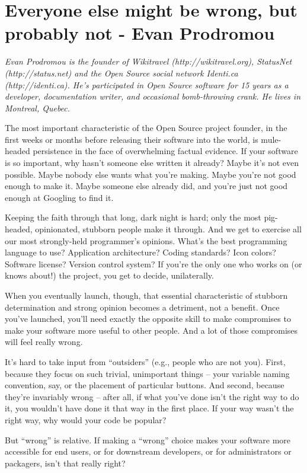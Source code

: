 \chapter{Everyone else might be wrong, but probably not - Evan Prodromou}

\textit{Evan Prodromou is the founder of Wikitravel (http://wikitravel.org), StatusNet (http://status.net) and the Open Source social network Identi.ca (http://identi.ca). He's participated in Open Source software for 15 years as a developer, documentation writer, and occasional bomb-throwing crank. He lives in Montreal, Quebec.}

The most important characteristic of the Open Source project founder, in the first weeks or months before releasing their software into the world, is mule-headed persistence in the face of overwhelming factual evidence. If your software is so important, why hasn't someone else written it already? Maybe it's not even possible. Maybe nobody else wants what you're making. Maybe you're not good enough to make it. Maybe someone else already did, and you're just not good enough at Googling to find it.

Keeping the faith through that long, dark night is hard; only the most pig-headed, opinionated, stubborn people make it through. And we get to exercise all our most strongly-held programmer's opinions. What's the best programming language to use? Application architecture? Coding standards? Icon colors? Software license? Version control system? If you're the only one who works on (or knows about!) the project, you get to decide, unilaterally.

When you eventually launch, though, that essential characteristic of stubborn determination and strong opinion becomes a detriment, not a benefit. Once you've launched, you'll need exactly the opposite skill to make compromises to make your software more useful to other people. And a lot of those compromises will feel really wrong.

It's hard to take input from “outsiders” (e.g., people who are not you). First, because they focus on such trivial, unimportant things – your variable naming convention, say, or the placement of particular buttons. And second, because they're invariably wrong – after all, if what you've done isn't the right way to do it, you wouldn't have done it that way in the first place. If your way wasn't the right way, why would your code be popular?

But “wrong” is relative. If making a “wrong” choice makes your software more accessible for end users, or for downstream developers, or for administrators or packagers, isn't that really right?

